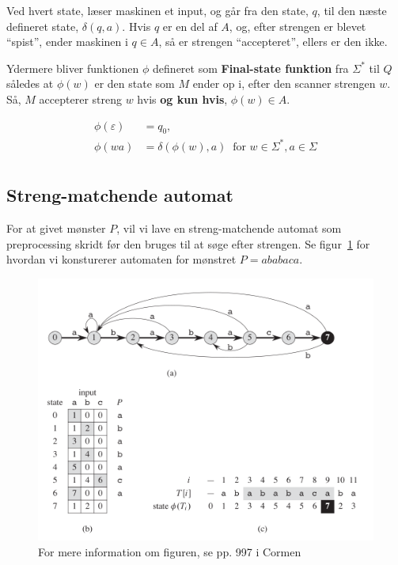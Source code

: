 \documentclass[11pt]{article}
\theoremstyle{definition}
\theoremstyle{remark}
\begin{document}
Ved hvert state, læser maskinen et input, og går fra den state, $q$, til den næste defineret state, $\delta(q,a)$. Hvis $q$ er en del af $A$, og, efter strengen er blevet ``spist'', ender maskinen i $q \in A$, så er strengen ``accepteret'', ellers er den ikke. 

Ydermere bliver funktionen $\phi$ defineret som \textbf{Final-state funktion} fra $\Sigma^{*}$ til $Q$ således at $\phi(w)$ er den state som    $M$ ender op i, efter den scanner strengen $w$. Så, $M$ accepterer streng $w$ hvis \textbf{og kun hvis}, $\phi(w) \in A$.

\begin{equation}
  \label{eq:finalstatefunction}
\begin{split}
  \phi(\varepsilon) &= q_{0},\\
         \phi(wa) &= \delta(\phi(w),a) \; \; \text{for } w \in \Sigma^{*}, a \in \Sigma\\
\end{split}
\end{equation}


\subsection{Streng-matchende automat}
\label{subsec:stringmatchingautomata}


For at givet mønster $P$, vil vi lave en streng-matchende automat som preprocessing skridt før den bruges til at søge efter strengen.  Se figur~\ref{fig:stringmatchingautomata} for hvordan vi konsturerer automaten for mønstret $P = ababaca$. 

\begin{figure}[ht]
  \centering

\includegraphics[width=400pt]{main--string-matching--streng-matchende-automat-6f23.png}  \caption{\label{fig:stringmatchingautomata} For mere information om figuren, se pp. 997 i Cormen}
\end{figure}
\end{document}
